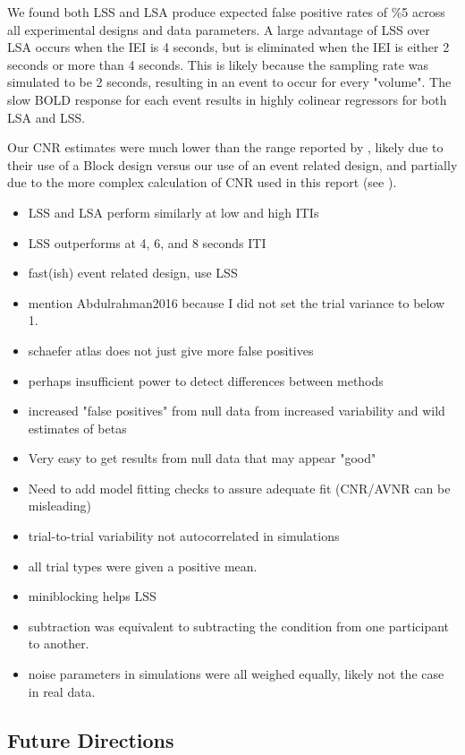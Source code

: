 \documentclass[10pt,letterpaper]{article}
\begin{document}
We found both LSS and LSA produce expected false positive rates of \%5
across all experimental designs and data parameters.
A large advantage of LSS over LSA occurs when the IEI is 4 seconds, but is eliminated
when the IEI is either 2 seconds or more than 4 seconds.
This is likely because the sampling rate was simulated to be 2 seconds, resulting
in an event to occur for every "volume".
The slow BOLD response for each event results in highly colinear regressors for both LSA and LSS.

Our CNR estimates were much lower than the range reported by \cite[Welvaert]{Welvaert2013a}, likely
due to their use of a Block design versus our use of an event related design,
and partially due to the more complex calculation of CNR used in this report
(see ).

\begin{itemize}
  \item LSS and LSA perform similarly at low and high ITIs
  \item LSS outperforms at 4, 6, and 8 seconds ITI
  \item fast(ish) event related design, use LSS
  \item mention Abdulrahman2016 because I did not set the trial variance to below 1.
  \item schaefer atlas does not just give more false positives
  \item perhaps insufficient power to detect differences between methods
  \item increased "false positives" from null data from increased variability and wild estimates of betas
  \item Very easy to get results from null data that may appear "good"
  \item Need to add model fitting checks to assure adequate fit (CNR/AVNR can be misleading)
  \item trial-to-trial variability not autocorrelated in simulations
  \item all trial types were given a positive mean.
  \item miniblocking helps LSS
  \item subtraction was equivalent to subtracting the condition from one participant to another.
  \item noise parameters in simulations were all weighed equally, likely not the case in real data. 
\end{itemize}

\subsection*{Future Directions}
\end{document}
